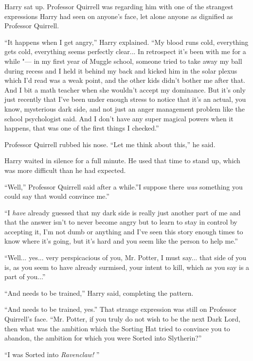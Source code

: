 Harry sat up. Professor Quirrell was regarding him with one of the
strangest expressions Harry had seen on anyone's face, let alone anyone
as dignified as Professor Quirrell.

``It happens when I get angry,'' Harry explained. ``My blood runs cold,
everything gets cold, everything seems perfectly clear... In
retrospect it's been with me for a while "--- in my first year of Muggle
school, someone tried to take away my ball during recess and I held it
behind my back and kicked him in the solar plexus which I'd read was a
weak point, and the other kids didn't bother me after that. And I bit a
math teacher when she wouldn't accept my dominance. But it's only just
recently that I've been under enough stress to notice that it's an
actual, you know, mysterious dark side, and not just an anger management
problem like the school psychologist said. And I don't have any super
magical powers when it happens, that was one of the first things I
checked.''

Professor Quirrell rubbed his nose. ``Let me think about this,'' he
said.

Harry waited in silence for a full minute. He used that time to stand
up, which was more difficult than he had expected.

``Well,'' Professor Quirrell said after a while.''I suppose there
\emph{was} something you could say that would convince me.''

``I \emph{have} already guessed that my dark side is really just another
part of me and that the answer isn't to never become angry but to learn
to stay in control by accepting it, I'm not dumb or anything and I've
seen this story enough times to know where it's going, but it's hard and
you seem like the person to help me.''

``Well... yes... very perspicacious of you, Mr. Potter, I must
say... that side of you is, as you seem to have already surmised,
your intent to kill, which as you say is a part of you...''

``And needs to be trained,'' Harry said, completing the pattern.

``And needs to be trained, yes.'' That strange expression was still on
Professor Quirrell's face. ``Mr. Potter, if you truly do not wish to be
the next Dark Lord, then what was the ambition which the Sorting Hat
tried to convince you to abandon, the ambition for which you were Sorted
into Slytherin?''

``I was Sorted into \emph{Ravenclaw!} ''

